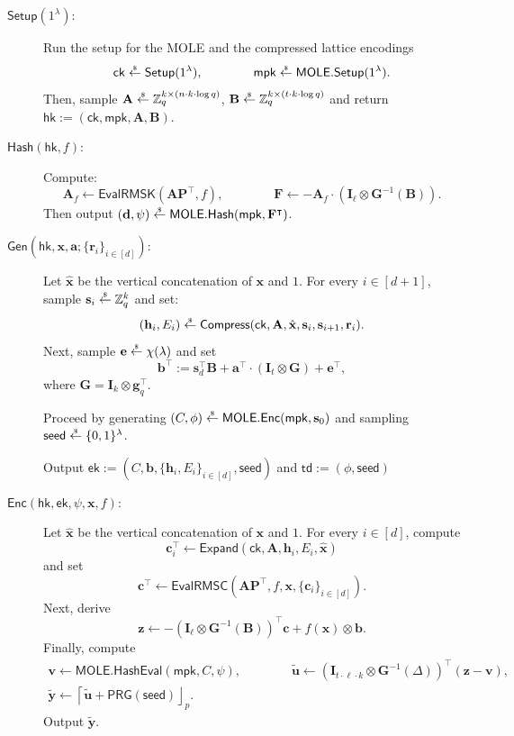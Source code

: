 \documentclass{theoretics}
\newcommand{\ek}{\mathsf{ek}}
\newcommand{\td}{\mathsf{td}}
\newcommand{\MOLE}{\mathsf{MOLE}}
\newcommand{\getsr}{\overset{\raisebox{-1pt}{$\scriptscriptstyle \$$}}{\gets}}
\newcommand{\sample}{\getsr}
\newcommand{\Z}{\mathbb{Z}}
\renewcommand{\sec}{\ensuremath{\lambda}}
\newcommand{\secpar}{\sec}
\newcommand{\Compress}{\mathsf{Compress}}
\newcommand{\ck}{\mathsf{ck}}
\newcommand{\algofont}[1]{\ensuremath{\mathsf{#1}}}
\newcommand{\Enc}{{\algofont{Enc}}}
\newcommand{\Setup}{{\algofont{Setup}}}
\newcommand{\Gen}{{\algofont{Gen}}}
\newcommand{\Eval}{\algofont{Eval}\xspace}
\newcommand{\Hash}{{\algofont{Hash}}}
\newcommand{\Expand}{\algofont{Expand}}
\newcommand{\id}{\ensuremath{\mathbf{I}}}
\newcommand{\mpk}{\mathsf{mpk}}
\newcommand{\hk}{\ensuremath{\mathsf{hk}}}
\newcommand\bbbone{1}
\newenvironment{protocol}[1][]
{\begin{algorithm}\caption{#1}}
  {\end{algorithm}}
\begin{document}
\begin{protocol}[Input-Succinct Reverse TDH for RMS]\label{prot:R1LFE}
\setlength{\abovedisplayskip}{6pt}\setlength{\belowdisplayskip}{6pt}
\setlength{\belowdisplayshortskip}{6pt}

\begin{description}
\item[$\Setup(1^\secpar)$:] Run the setup for the MOLE and the compressed lattice encodings
\[\ck\sample\Setup(\bbbone^\sec),\qquad \qquad \mpk\sample\MOLE.\Setup(\bbbone^\sec).\]
Then, sample $\mathbf{A}\sample\Z_q^{k\times (n\cdot k\cdot \log q)}$, $\mathbf{B}\sample\Z_q^{k\times (t\cdot k\cdot \log q)}$ and return $\hk:=(\ck, \mpk, \mathbf{A}, \mathbf{B})$.


\item[$\Hash(\hk, f)$:] Compute:
\[ \mathbf{A}_f\gets \Eval\mathsf{RMSK}(\mathbf{A}\mathbf{P}^\intercal, f), \qquad \qquad \mathbf{F}\gets -\mathbf{A}_f\cdot (\id_\ell \otimes \mathbf{G}^{-1}(\mathbf{B})).\]
Then output $(\mathbf{d}, \psi)\sample\MOLE.\Hash(\mpk,\mathbf{F}^\intercal)$.



\item[$\Gen\left(\hk, \mathbf{x}, \mathbf{a}; \{\mathbf{r}_i\}_{i\in[d]}\right)$:] Let $\hat{\mathbf{x}}$ be the vertical concatenation of $\mathbf{x}$ and $1$.
For every $i\in[d+1]$, sample $\mathbf{s}_i\sample\Z_q^k$ and set:
\[(\mathbf{h}_i, E_{i})\sample\Compress(\ck, \mathbf{A}, \hat{\mathbf{x}}, \mathbf{s}_i, \mathbf{s}_{i+1}, \mathbf{r}_i).\]
Next, sample $\mathbf{e}\sample\chi(\sec)$ and set
\[
\mathbf{b}^\intercal:= \mathbf{s}_d^\intercal \mathbf{B}+\mathbf{a}^\intercal\cdot (\id_t\otimes \mathbf{G}) +\mathbf{e}^\intercal,
\]
where $\mathbf{G}=\id_k\otimes \mathbf{g}_q^\intercal$.

Proceed by generating $(C, \phi)\sample\MOLE.\Enc(\mpk, \mathbf{s}_0)$ and sampling $\mathsf{seed}\sample\{0, 1\}^\sec$.

 Output $\ek:=(C, \mathbf{b}, \{\mathbf{h}_i, E_i\}_{i\in[d]}, \mathsf{seed})$ and $\td:=(\phi, \mathsf{seed})$


\item[$\Enc(\hk, \ek, \psi, \mathbf{x}, f)$:] Let $\hat{\mathbf{x}}$ be the vertical concatenation of $\mathbf{x}$ and $1$. For every $i\in[d]$, compute
\[
\mathbf{c}_i^\intercal\gets \Expand(\ck, \mathbf{A}, \mathbf{h}_i, E_i, \hat{\mathbf{x}})
\]
and set
\[
\mathbf{c}^\intercal\gets \Eval\mathsf{RMSC}(\mathbf{A}\mathbf{P}^\intercal, f, \mathbf{x}, \{\mathbf{c}_i\}_{i\in[d]}).
\]
Next, derive
\[
\mathbf{z}\gets -(\id_\ell\otimes \mathbf{G}^{-1}(\mathbf{B}))^\intercal \mathbf{c}
+f(\mathbf{x})\otimes \mathbf{b}.
\]
Finally, compute
\begin{gather*}
\mathbf{v}\gets \MOLE.\Hash\Eval(\mpk, C, \psi), \qquad\qquad
\tilde{\mathbf{u}}\gets (\id_{t\cdot \ell\cdot k}\otimes \mathbf{G}^{-1}(\Delta))^\intercal (\mathbf{z}-\mathbf{v}),\\
\tilde{\mathbf{y}}\gets \left\lceil \tilde{\mathbf{u}}+\mathsf{PRG}(\mathsf{seed})\right\rfloor_p.
\end{gather*}
 Output $\tilde{\mathbf{y}}$. 


\end{description}
\end{protocol}
\end{document}
